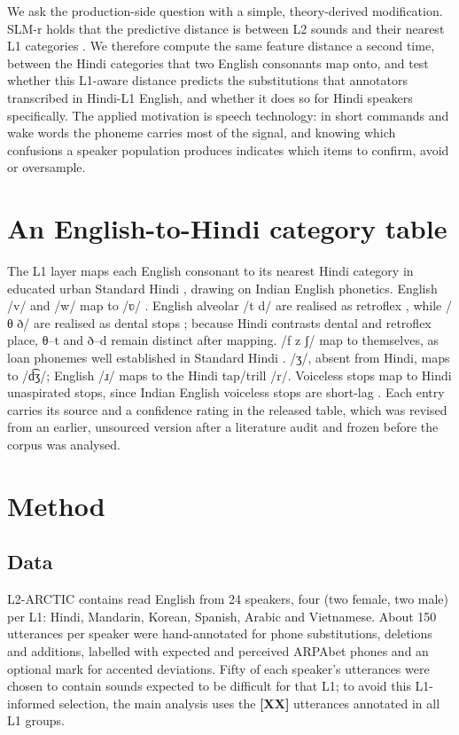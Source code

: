 \documentclass[a4paper,11pt,twocolumn]{article}
\newcommand{\ipa}[1]{{\ipafont #1}}
\newcommand{\res}[1]{\textbf{[#1]}} %
\begin{document}
We ask the production-side question with a simple, theory-derived modification. SLM-r holds that the predictive distance is between L2 sounds and their nearest L1 categories \cite{FlegeBohn:2021}. We therefore compute the same feature distance a second time, between the Hindi categories that two English consonants map onto, and test whether this L1-aware distance predicts the substitutions that annotators transcribed in Hindi-L1 English, and whether it does so for Hindi speakers specifically. The applied motivation is speech technology: in short commands and wake words the phoneme carries most of the signal, and knowing which confusions a speaker population produces indicates which items to confirm, avoid or oversample.

\section{An English-to-Hindi category table}

The L1 layer maps each English consonant to its nearest Hindi category in educated urban Standard Hindi \cite{Ohala:1994}, drawing on Indian English phonetics. English \ipa{/v/} and \ipa{/w/} map to \ipa{/ʋ/} \cite{Grover:2021,Grover:2025,Fuchs:2019}. English alveolar \ipa{/t d/} are realised as retroflex \ipa{[ʈ ɖ]} \cite{SirsaRedford:2013,Jain:2022}, while \ipa{/θ ð/} are realised as dental stops \ipa{[t̪ʰ d̪]} \cite{Sailaja:2009,Jain:2022}; because Hindi contrasts dental and retroflex place, \ipa{θ}--\ipa{t} and \ipa{ð}--\ipa{d} remain distinct after mapping. \ipa{/f z ʃ/} map to themselves, as loan phonemes well established in Standard Hindi \cite{Ohala:1994}. \ipa{/ʒ/}, absent from Hindi, maps to \ipa{/d͡ʒ/}; English \ipa{/ɹ/} maps to the Hindi tap/trill \ipa{/r/}. Voiceless stops map to Hindi unaspirated stops, since Indian English voiceless stops are short-lag \cite{SirsaRedford:2013}. Each entry carries its source and a confidence rating in the released table, which was revised from an earlier, unsourced version after a literature audit and frozen before the corpus was analysed.

\section{Method}

\subsection{Data}

L2-ARCTIC \cite{Zhao:2018} contains read English from 24 speakers, four (two female, two male) per L1: Hindi, Mandarin, Korean, Spanish, Arabic and Vietnamese. About 150 utterances per speaker were hand-annotated for phone substitutions, deletions and additions, labelled with expected and perceived ARPAbet phones and an optional mark for accented deviations. Fifty of each speaker's utterances were chosen to contain sounds expected to be difficult for that L1; to avoid this L1-informed selection, the main analysis uses the \res{XX} utterances annotated in all L1 groups.
\end{document}
